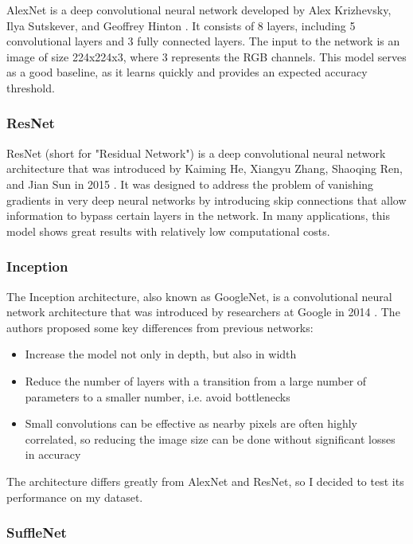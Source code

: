\documentclass[reqno]{article}
\begin{document}
	AlexNet is a deep convolutional neural network developed by Alex Krizhevsky, Ilya Sutskever, and Geoffrey Hinton \citep{NIPS2012_c399862d}. It consists of 8 layers, including 5 convolutional layers and 3 fully connected layers. The input to the network is an image of size 224x224x3, where 3 represents the RGB channels. This model serves as a good baseline, as it learns quickly and provides an expected accuracy threshold.

\subsubsection{ResNet}

	ResNet (short for "Residual Network") is a deep convolutional neural network architecture that was introduced by Kaiming He, Xiangyu Zhang, Shaoqing Ren, and Jian Sun in 2015 \citep{he2015deep}. It was designed to address the problem of vanishing gradients in very deep neural networks by introducing skip connections that allow information to bypass certain layers in the network. In many applications, this model shows great results with relatively low computational costs.

\subsubsection{Inception}

	The Inception architecture, also known as GoogleNet, is a convolutional neural network architecture that was introduced by researchers at Google in 2014 \citep{szegedy2015rethinking}. The authors proposed some key differences from previous networks:
	
	\begin{itemize}
		\item Increase the model not only in depth, but also in width
		\item Reduce the number of layers with a transition from a large number of parameters to a smaller number, i.e. avoid bottlenecks
		\item Small convolutions can be effective as nearby pixels are often highly correlated, so reducing the image size can be done without significant losses in accuracy
	\end{itemize}

The architecture differs greatly from AlexNet and ResNet, so I decided to test its performance on my dataset.


\subsubsection{SuffleNet}
\end{document}
